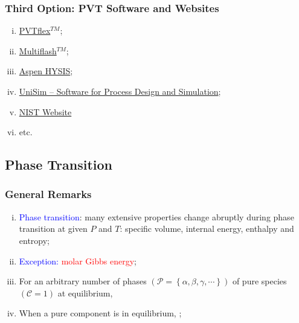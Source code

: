 \documentclass[10pt,compress,unknownkeysallowed]{beamer}
\begin{document}
\begin{frame}
  \frametitle{Third Option: PVT Software and Websites}
\noindent
\begin{enumerate}[i)]
   \item<1-> \href{http://www.weatherford.com/doc/wft183650}{PVTflex$^{TM}$};
   \item<1-> \href{http://www.kbcat.com/infochem-software/flow-assurance-software-multiflash/pvt-simulation}{Multiflash$^{TM}$};
   \item<1-> \href{http://home.aspentech.com/products/engineering/aspen-hysys}{Aspen HYSIS};
   \item<1-> \href{https://www.honeywellprocess.com/en-US/explore/products/advanced-applications/unisim/Pages/default.aspx}{UniSim – Software for Process Design and Simulation};
   \item<1-> \href{http://webbook.nist.gov/chemistry/fluid/}{NIST Website}
   \item<1-> etc.
\end{enumerate}

\end{frame}


\subsection{Phase Transition}
\begin{frame}
  \frametitle{General Remarks}
     \begin{enumerate}[i)]
         \item<1-> \textcolor{blue}{Phase transition}: many extensive properties change abruptly during phase transition at given $P$ and $T$: specific volume, internal energy, enthalpy and entropy;
         \item<2-> \textcolor{blue}{Exception:} \textcolor{red}{molar Gibbs energy};
         \item<3-> For an arbitrary number of phases $\left(\mathcal{P}=\left\{\alpha, \beta, \gamma, \cdots\right\}\right)$ of pure species $\left(\mathcal{C}=1\right)$ at equilibrium,
         \item<4-> When a pure component is in equilibrium, ;
     \end{enumerate}

\end{frame}
\normalsize
\end{document}
